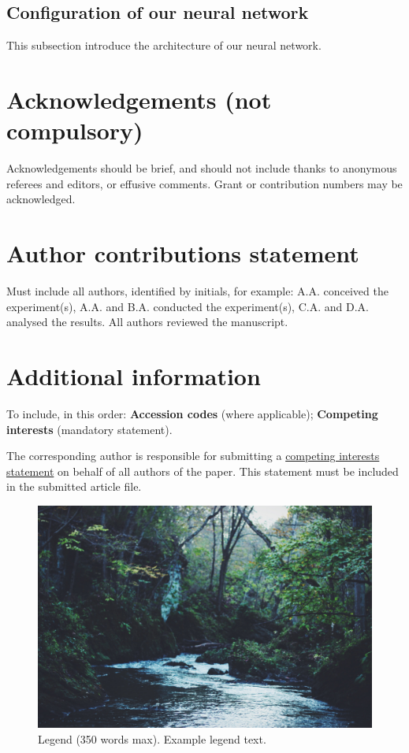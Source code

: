 \documentclass[fleqn,10pt,twocolumn]{wlscirep}
\begin{document}
\subsection*{Configuration of our neural network}
This subsection introduce the architecture of our neural network.


\section*{Acknowledgements (not compulsory)}

Acknowledgements should be brief, and should not include thanks to anonymous referees and editors, or effusive comments. Grant or contribution numbers may be acknowledged.

\section*{Author contributions statement}

Must include all authors, identified by initials, for example:
A.A. conceived the experiment(s),  A.A. and B.A. conducted the experiment(s), C.A. and D.A. analysed the results.  All authors reviewed the manuscript. 

\section*{Additional information}

To include, in this order: \textbf{Accession codes} (where applicable); \textbf{Competing interests} (mandatory statement). 

The corresponding author is responsible for submitting a \href{http://www.nature.com/srep/policies/index.html#competing}{competing interests statement} on behalf of all authors of the paper. This statement must be included in the submitted article file.

\begin{figure}[ht]
\centering
\includegraphics[width=\linewidth]{stream}
\caption{Legend (350 words max). Example legend text.}
\label{fig:stream}
\end{figure}
\end{document}
